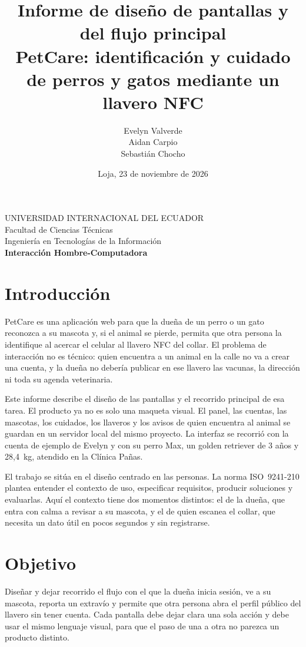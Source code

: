 \documentclass[12pt,a4paper]{article}
\title{\textbf{Informe de diseño de pantallas y del flujo principal}\\[0.4em]
\large PetCare: identificación y cuidado de perros y gatos mediante un llavero NFC}
\author{Evelyn Valverde\\Aidan Carpio\\Sebastián Chocho}
\date{Loja, 23 de noviembre de 2026}
\begin{document}
\begin{center}
{\large UNIVERSIDAD INTERNACIONAL DEL ECUADOR}\\[0.2em]
Facultad de Ciencias Técnicas\\
Ingeniería en Tecnologías de la Información\\[0.8em]
{\large \textbf{Interacción Hombre-Computadora}}
\end{center}

\maketitle
\thispagestyle{empty}
\newpage

\section{Introducción}

PetCare es una aplicación web para que la dueña de un perro o un gato reconozca a su mascota y, si el animal se pierde, permita que otra persona la identifique al acercar el celular al llavero NFC del collar. El problema de interacción no es técnico: quien encuentra a un animal en la calle no va a crear una cuenta, y la dueña no debería publicar en ese llavero las vacunas, la dirección ni toda su agenda veterinaria.

Este informe describe el diseño de las pantallas y el recorrido principal de esa tarea. El producto ya no es solo una maqueta visual. El panel, las cuentas, las mascotas, los cuidados, los llaveros y los avisos de quien encuentra al animal se guardan en un servidor local del mismo proyecto. La interfaz se recorrió con la cuenta de ejemplo de Evelyn y con su perro Max, un golden retriever de 3 años y 28,4~kg, atendido en la Clínica Pañas.

El trabajo se sitúa en el diseño centrado en las personas. La norma ISO~9241-210 plantea entender el contexto de uso, especificar requisitos, producir soluciones y evaluarlas. Aquí el contexto tiene dos momentos distintos: el de la dueña, que entra con calma a revisar a su mascota, y el de quien escanea el collar, que necesita un dato útil en pocos segundos y sin registrarse.

\section{Objetivo}

Diseñar y dejar recorrido el flujo con el que la dueña inicia sesión, ve a su mascota, reporta un extravío y permite que otra persona abra el perfil público del llavero sin tener cuenta. Cada pantalla debe dejar clara una sola acción y debe usar el mismo lenguaje visual, para que el paso de una a otra no parezca un producto distinto.
\end{document}
